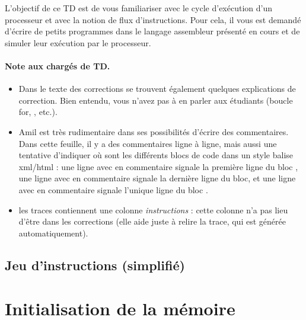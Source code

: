 
\newcommand{\commentaire}[1]{}


L'objectif de ce TD est de vous familiariser avec le cycle d'exécution d'un processeur et avec la notion de flux d'instructions. Pour cela, il vous est demandé d'écrire de petits programmes dans le langage assembleur présenté en cours et de simuler leur exécution par le processeur.

\begin{correction}
 \paragraph{Note aux chargés de TD.}
  \begin{itemize}
  \item Dans le texte des corrections se trouvent également quelques
    explications de correction. Bien entendu, vous n'avez pas à en
    parler aux étudiants (boucle for, , etc.).
  \item Amil est très rudimentaire dans ses possibilités d'écrire des
    commentaires. Dans cette feuille, il y a des commentaires ligne à
    ligne, mais aussi une tentative d'indiquer où sont les différents
    blocs de code dans un style balise xml/html : une ligne avec en
    commentaire  signale la première ligne du bloc
    , une ligne avec en commentaire  signale la
    dernière ligne du bloc, et une ligne avec en commentaire
     signale l'unique ligne du bloc .
  \item les traces contiennent une colonne \emph{instructions} : cette
    colonne n'a pas lieu d'être dans les corrections (elle aide juste
    à relire la trace, qui est générée automatiquement).
  \end{itemize}
\end{correction}

\subsection*{Jeu d'instructions (simplifié)}

\noindent

\section{Initialisation de la mémoire}

